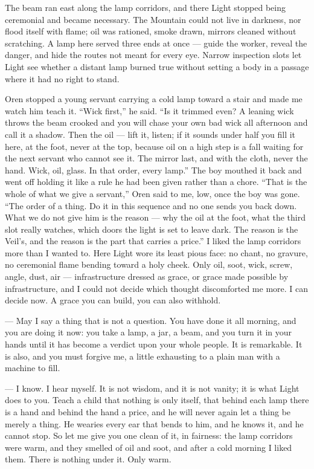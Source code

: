 \ornament

\noindent The beam ran east along the lamp corridors, and there Light stopped being ceremonial and became necessary. The Mountain could not live in darkness, nor flood itself with flame; oil was rationed, smoke drawn, mirrors cleaned without scratching. A lamp here served three ends at once --- guide the worker, reveal the danger, and hide the routes not meant for every eye. Narrow inspection slots let Light see whether a distant lamp burned true without setting a body in a passage where it had no right to stand.\par

Oren stopped a young servant carrying a cold lamp toward a stair and made me watch him teach it. ``Wick first,'' he said. ``Is it trimmed even? A leaning wick throws the beam crooked and you will chase your own bad wick all afternoon and call it a shadow. Then the oil --- lift it, listen; if it sounds under half you fill it here, at the foot, never at the top, because oil on a high step is a fall waiting for the next servant who cannot see it. The mirror last, and with the cloth, never the hand. Wick, oil, glass. In that order, every lamp.'' The boy mouthed it back and went off holding it like a rule he had been given rather than a chore. ``That is the whole of what we give a servant,'' Oren said to me, low, once the boy was gone. ``The order of a thing. Do it in this sequence and no one sends you back down. What we do not give him is the reason --- why the oil at the foot, what the third slot really watches, which doors the light is set to leave dark. The reason is the Veil's, and the reason is the part that carries a price.'' I liked the lamp corridors more than I wanted to. Here Light wore its least pious face: no chant, no gravure, no ceremonial flame bending toward a holy cheek. Only oil, soot, wick, screw, angle, dust, air --- infrastructure dressed as grace, or grace made possible by infrastructure, and I could not decide which thought discomforted me more. I can decide now. A grace you can build, you can also withhold.\par

\begin{room}

--- May I say a thing that is not a question. You have done it all morning, and you are doing it now: you take a lamp, a jar, a beam, and you turn it in your hands until it has become a verdict upon your whole people. It is remarkable. It is also, and you must forgive me, a little exhausting to a plain man with a machine to fill.

--- I know. I hear myself. It is not wisdom, and it is not vanity; it is what Light does to you. Teach a child that nothing is only itself, that behind each lamp there is a hand and behind the hand a price, and he will never again let a thing be merely a thing. He wearies every ear that bends to him, and he knows it, and he cannot stop. So let me give you one clean of it, in fairness: the lamp corridors were warm, and they smelled of oil and soot, and after a cold morning I liked them. There is nothing under it. Only warm.

\end{room}

